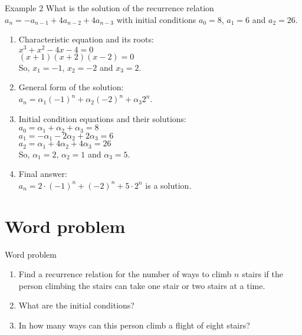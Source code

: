\documentclass{beamer}
\begin{document}
\begin{frame}{Example 2}
    What is the solution of the recurrence relation $a_n = -a_{n-1} + 4 a_{n-2} + 4 a_{n-3}$ with initial conditions $a_0 = 8$, $a_1 = 6$ and $a_2 = 26$.
    \footnotesize
    \begin{enumerate}[<+->]
        \item Characteristic equation and its roots: \\
        $ x^3 + x^2 - 4x - 4 = 0 $ \\
        $ (x + 1)(x + 2)(x - 2) = 0 $ \\
        So, $x_1 = -1$, $x_2 = -2$ and $x_3 = 2$.
        \item General form of the solution: \\
        $ a_n = \alpha_1 (-1)^n + \alpha_2 (-2)^n + \alpha_3 2^n $.
        \item Initial condition equations and their solutions: \\
        $ a_0 = \alpha_1 + \alpha_2 + \alpha_3 = 8 $ \\
        $ a_1 = - \alpha_1 - 2 \alpha_2 + 2 \alpha_3 = 6 $ \\
        $ a_2 = \alpha_1 + 4 \alpha_2 + 4 \alpha_3 = 26 $ \\
        So, $\alpha_1 = 2$, $\alpha_2 = 1$ and $\alpha_3 = 5$.
        \item Final answer: \\
        $ a_n = 2 \cdot (-1)^n + (-2)^n + 5 \cdot 2^n $ is a solution.
    \end{enumerate}
\end{frame}

\section{Word problem}

\begin{frame}{Word problem}
    \begin{enumerate}[<+->]
        \item Find a recurrence relation for the number of ways to climb $n$ stairs if the person climbing the stairs can take one stair or two stairs at a time.
        \item What are the initial conditions?
        \item In how many ways can this person climb a flight of eight stairs?
    \end{enumerate}
\end{frame}
\end{document}
